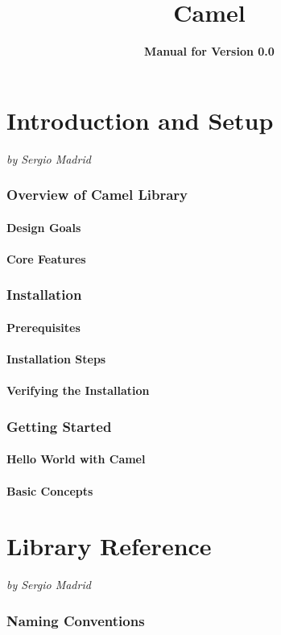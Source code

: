 \documentclass[a4paper,oneside]{article}
\title{\textbf{Camel}}
\author{\textbf{Manual for Version 0.0}}
\newcommand{\authoredpart}[2]{
  \clearpage
  \part{#1}
  \vspace{-1em} %
  \large{\textit{by #2}}
  \vspace{2em} %
}
\begin{document}
\maketitle
\thispagestyle{empty}
\newpage

\tableofcontents
\newpage


\authoredpart{Introduction and Setup}{Sergio Madrid}

\section{Overview of Camel Library}
\subsection{Design Goals}
\subsection{Core Features}

\section{Installation}
\subsection{Prerequisites}
\subsection{Installation Steps}
\subsection{Verifying the Installation}

\section{Getting Started}
\subsection{Hello World with Camel}
\subsection{Basic Concepts}


\authoredpart{Library Reference}{Sergio Madrid}

\section{Naming Conventions}
\end{document}
